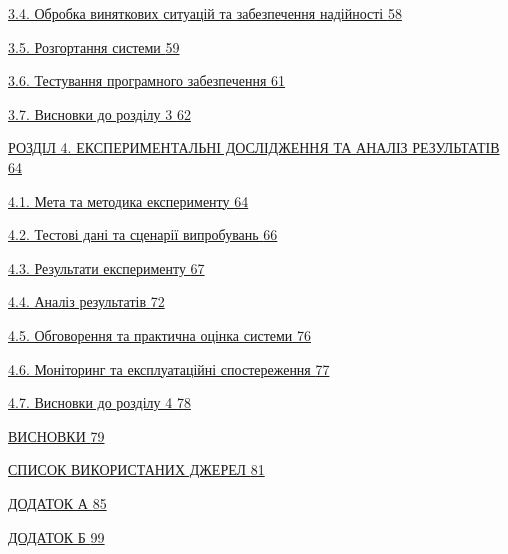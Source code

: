 \documentclass[
]{article}
\begin{document}
\hyperref[X233d53f55b975de4cf5ff725e3a3cb5b620865a]{3.4. Обробка
виняткових ситуацій та забезпечення надійності
\hyperref[X233d53f55b975de4cf5ff725e3a3cb5b620865a]{58}}

\hyperref[Xff4a6440b3448fe2a05c600581de26ed60a0266]{3.5. Розгортання
системи \hyperref[Xff4a6440b3448fe2a05c600581de26ed60a0266]{59}}

\hyperref[X8f3ee387a6af2e6a42daf1c469a75f69834e211]{3.6. Тестування
програмного забезпечення
\hyperref[X8f3ee387a6af2e6a42daf1c469a75f69834e211]{61}}

\hyperref[X17d74082d0a87aa1b85234bfe942da3cb20d5dd]{3.7. Висновки до
розділу 3 \hyperref[X17d74082d0a87aa1b85234bfe942da3cb20d5dd]{62}}

\hyperref[_Toc230737401]{РОЗДІЛ 4. ЕКСПЕРИМЕНТАЛЬНІ ДОСЛІДЖЕННЯ ТА
АНАЛІЗ РЕЗУЛЬТАТІВ \hyperref[_Toc230737401]{64}}

\hyperref[X9901825f527ce598bce4154cca8411ada8f4262]{4.1. Мета та
методика експерименту
\hyperref[X9901825f527ce598bce4154cca8411ada8f4262]{64}}

\hyperref[Xafea3fa084fe9e384714cab4626ef55af9419bd]{4.2. Тестові дані та
сценарії випробувань
\hyperref[Xafea3fa084fe9e384714cab4626ef55af9419bd]{66}}

\hyperref[X2c95f06dc8830c6c22461aaa9f63c5b7a63654c]{4.3. Результати
експерименту \hyperref[X2c95f06dc8830c6c22461aaa9f63c5b7a63654c]{67}}

\hyperref[Xeca429076ae93597dc7393f715a486506130431]{4.4. Аналіз
результатів \hyperref[Xeca429076ae93597dc7393f715a486506130431]{72}}

\hyperref[X41d40d80f9720555f1c92d525ddc8af9033b9de]{4.5. Обговорення та
практична оцінка системи
\hyperref[X41d40d80f9720555f1c92d525ddc8af9033b9de]{76}}

\hyperref[Xddcc2d41e218d4eab0104affeeaeb116ef3d72e]{4.6. Моніторинг та
експлуатаційні спостереження
\hyperref[Xddcc2d41e218d4eab0104affeeaeb116ef3d72e]{77}}

\hyperref[Xefd44ea7b278ecae6826470684261cf88301aae]{4.7. Висновки до
розділу 4 \hyperref[Xefd44ea7b278ecae6826470684261cf88301aae]{78}}

\hyperref[_Toc230737409]{ВИСНОВКИ \hyperref[_Toc230737409]{79}}

\hyperref[_Toc230737410]{СПИСОК ВИКОРИСТАНИХ ДЖЕРЕЛ
\hyperref[_Toc230737410]{81}}

\hyperref[_Toc230737411]{ДОДАТОК А \hyperref[_Toc230737411]{85}}

\hyperref[_Toc230737412]{ДОДАТОК Б \hyperref[_Toc230737412]{99}}
\end{document}

